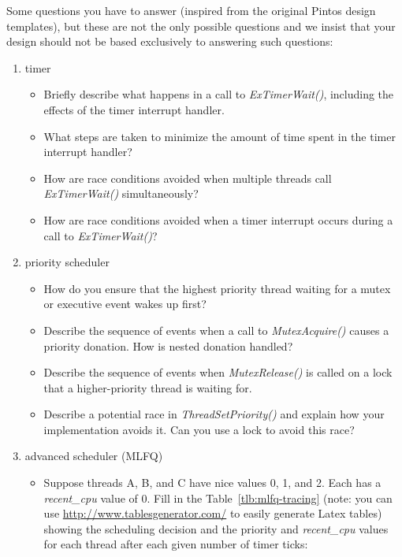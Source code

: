 Some questions you have to answer (inspired from the original Pintos design templates), but these are not the only possible questions and we insist that your design should not be based exclusively to answering such questions:\begin{enumerate}
    \item timer
        \begin{itemize}
            \item Briefly describe what happens in a call to \textit{ExTimerWait()}, including the effects of the timer interrupt handler.
            \item What steps are taken to minimize the amount of time spent in the timer interrupt handler?
            \item How are race conditions avoided when multiple threads call \textit{ExTimerWait()} simultaneously?
            \item How are race conditions avoided when a timer interrupt occurs during a call to \textit{ExTimerWait()}?
        \end{itemize}
    
    \item priority scheduler
        \begin{itemize}
            \item How do you ensure that the highest priority thread waiting for a mutex or executive event wakes up first?
    
            \item Describe the sequence of events when a call to \textit{MutexAcquire()} causes a priority donation.  How is nested donation handled?
            
            \item Describe the sequence of events when \textit{MutexRelease()} is called on a lock that a higher-priority thread is waiting for.
            
            \item Describe a potential race in \textit{ThreadSetPriority()} and explain how your implementation avoids it.  Can you use a lock to avoid this race?
        \end{itemize}

    \item advanced scheduler (MLFQ)
        \begin{itemize}
            \item Suppose threads A, B, and C have nice values 0, 1, and 2. Each has a \textit{recent\_cpu} value of 0.  Fill in the Table~\ref{tlb:mlfq-tracing}  (note: you can use \url{http://www.tablesgenerator.com/} to easily generate Latex tables) showing the scheduling decision and the priority and \textit{recent\_cpu} values for each thread after each given number of timer ticks:


\end{itemize}
\end{enumerate}
